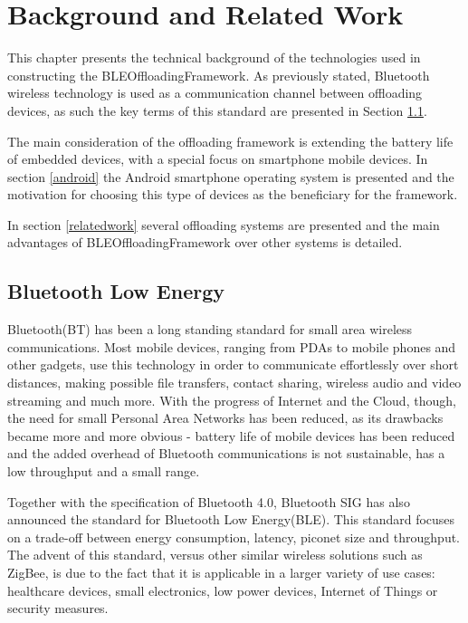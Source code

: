 \chapter{Background and Related Work}
\label{chapter:stateoftheart}

This chapter presents the technical background of the technologies used in constructing the BLEOffloadingFramework. As previously stated, Bluetooth wireless technology is used as a communication channel between offloading devices, as such the key terms of this standard are presented in Section \ref{ble}.

The main consideration of the offloading framework is extending the battery life of embedded devices, with a special focus on smartphone mobile devices. In section \ref{android} the Android smartphone operating system is presented and the motivation for choosing this type of devices as the beneficiary for the framework.

In section \ref{relatedwork} several offloading systems are presented and the main advantages of BLEOffloadingFramework over other systems is detailed.

\section{Bluetooth Low Energy}
\label{ble}

Bluetooth(BT) has been a long standing standard for small area wireless communications. Most mobile devices, ranging from PDAs to mobile phones and other gadgets, use this technology in order to communicate effortlessly over short distances, making possible file transfers, contact sharing, wireless audio and video streaming and much more. With the progress of Internet and the Cloud, though, the need for small Personal Area Networks has been reduced, as its drawbacks became more and more obvious - battery life of mobile devices has been reduced and the added overhead of Bluetooth communications is not sustainable, has a low throughput and a small range. 

Together with the specification of Bluetooth 4.0, Bluetooth SIG has also announced the standard for Bluetooth Low Energy(BLE)\cite{gomez2012overview}. This standard focuses on a trade-off between energy consumption, latency, piconet size and throughput. The advent of this standard, versus other similar wireless solutions such as ZigBee, is due to the fact that it is applicable in a larger variety of use cases: healthcare devices, small electronics, low power devices, Internet of Things or security measures.

